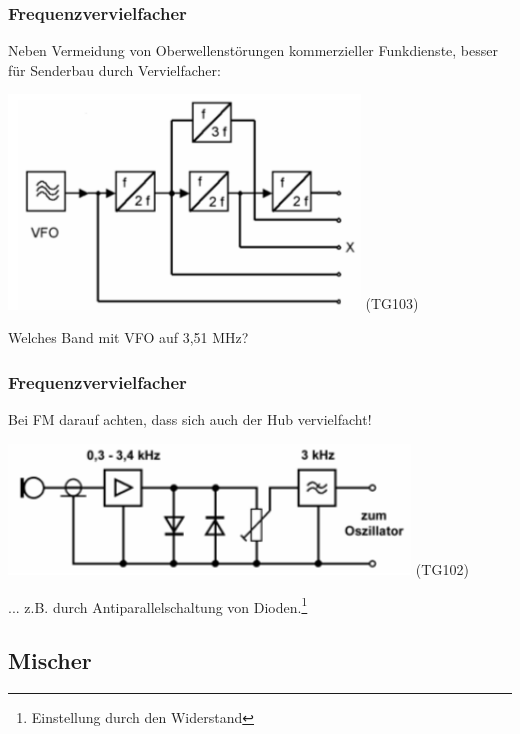 \begin{frame}
    \frametitle{Frequenzvervielfacher}

    Neben Vermeidung von Oberwellenstörungen kommerzieller Funkdienste,
    besser für Senderbau durch Vervielfacher:

    \begin{center}
        \includegraphics[width=0.7\textwidth]{a13/TG103a.png}
        \tiny (TG103)
    \end{center}

    Welches Band mit VFO auf 3,51 MHz? 

\end{frame}

\begin{frame}
    \frametitle{Frequenzvervielfacher}

    Bei FM darauf achten, dass sich auch der Hub vervielfacht!

    \begin{center}
        \includegraphics[width=0.8\textwidth]{a13/TG102.png}
        \tiny (TG102)
    \end{center}

    ... z.B. durch Antiparallelschaltung von Dioden.\footnote{Einstellung durch
    den Widerstand}

\end{frame}

\subsection{Mischer}

